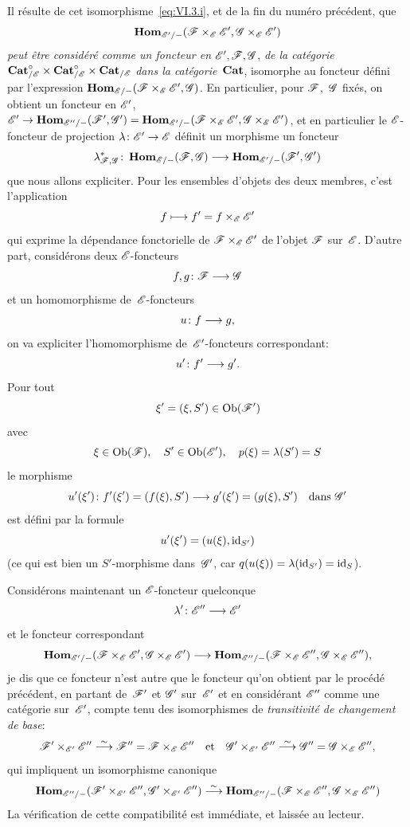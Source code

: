 Il r\'esulte de cet isomorphisme~\eqref{eq:VI.3.i}, et de la fin du
num\'ero pr\'ec\'edent, que
$$
\SheafHom_{\cal{E}'/-}(\cal{F}\times_{\cal{E}}\cal{E}',\cal{G}
\times_{\cal{E}}\cal{E}')
$$
\emph{peut être considéré comme un foncteur en}
$\cal{E}',\cal{F},\cal{G}$, \emph{de la catégorie}
$\Cat_{/\cal{E}}^\circ\times\Cat_{/\cal{E}}^\circ\times\Cat_{/\cal{E}}$
\emph{dans la catégorie}~$\mathbf{Cat}$, isomorphe au foncteur d\'efini
par l'expression
$\SheafHom_{\cal{E}/-}(\cal{F}\times_{\cal{E}}\cal{E}',\cal{G})$. En
particulier, pour $\cal{F}$,~$\cal{G}$ fix\'es, on obtient un
foncteur en $\cal{E}'$, $\cal{E}'\to
\SheafHom_{\cal{E}''/-}(\cal{F}',\cal{G}')=
\SheafHom_{\cal{E}'/-}(\cal{F}\times_{\cal{E}}
\cal{E}',\cal{G}\times_{\cal{E}}\cal{E}')$, et en particulier le
$\cal{E}$-foncteur de projection $\lambda\colon \cal{E}'\to\cal{E}$
d\'efinit un morphisme \ie un foncteur
$$
\lambda^*_{\cal{F},\cal{G}}\colon
\SheafHom_{\cal{E}/-}(\cal{F},\cal{G})\to
\SheafHom_{\cal{E}'/-}(\cal{F}',\cal{G}')
$$
que nous allons expliciter. Pour les ensembles d'objets des deux
membres, c'est l'application
$$
f\mto f'=f\times_{\cal{E}}\cal{E}'
$$
qui exprime la d\'ependance fonctorielle de
$\cal{F}\times_{\cal{E}}\cal{E}'$ de l'objet $\cal{F}$
sur~$\cal{E}$. D'autre part, consid\'erons deux $\cal{E}$-foncteurs
$$
f,g\colon\cal{F}\to \cal{G}
$$
et un homomorphisme de~$\cal{E}$-foncteurs
$$
u\colon f\to g\quoi,
$$
on
va expliciter l'homomorphisme de~$\cal{E}'$-foncteurs correspondant:
$$
u'\colon f'\to g'\quoi.
$$
Pour tout
$$
\xi'=(\xi,S')\in\Ob(\cal{F}')
$$
avec
$$
\xi\in\Ob(\cal{F}),\quad S'\in\Ob(\cal{E}'),\quad p(\xi)=\lambda(S')=S
$$
le morphisme
$$
u'(\xi')\colon f'(\xi')=(f(\xi),S')\to g'(\xi')=(g(\xi),S')\quad
\text{dans } \cal{G}'
$$
est d\'efini par la formule
$$
u'(\xi')=(u(\xi),\mathrm{id}_{S'})
$$
(ce qui est bien un $S'$-morphisme dans~$\cal{G}'$, car
$q(u(\xi))=\lambda(\mathrm{id}_{S'})=\mathrm{id}_S$).

Consid\'erons maintenant un $\cal{E}$-foncteur quelconque
$$
\lambda'\colon\cal{E}''\to\cal{E}'
$$
et le foncteur correspondant
$$
\SheafHom_{\cal{E}'/-}(\cal{F}\times_{\cal{E}}\cal{E}',
\cal{G}\times_{\cal{E}}\cal{E}')\to
\SheafHom_{\cal{E}''/-}(\cal{F}\times_{\cal{E}}\cal{E}'',
\cal{G}\times_{\cal{E}}\cal{E}'')\quoi,
$$
je dis que ce foncteur n'est autre que le foncteur qu'on obtient par
le proc\'ed\'e pr\'ec\'edent, en partant de~$\cal{F}'$ et
$\cal{G}'$ sur~$\cal{E}'$ et en consid\'erant $\cal{E}''$ comme une
cat\'egorie sur~$\cal{E}'$, compte tenu des isomorphismes de
\emph{\og transitivité de changement de base\fg}:
$$
\cal{F}'\times_{\cal{E}'}\cal{E}''\isomto
\cal{F}''=\cal{F}\times_{\cal{E}}\cal{E}''\quad
\text{et}\quad\cal{G}'\times_{\cal{E}'}\cal{E}''\isomto\cal{G}''
=\cal G\times_{\cal E}\cal E''\quoi,
$$
qui impliquent un isomorphisme canonique
$$
\SheafHom_{\cal{E}''/-}(\cal{F}'\times_{\cal{E}'}\cal{E}'',
\cal{G}'\times_{\cal{E}'}\cal{E}'')\isomto
\SheafHom_{\cal{E}''/-}(\cal{F}\times_{\cal{E}}\cal{E}'',
\cal{G}\times_{\cal{E}}\cal{E}'')
$$
La
v\'erification de cette compatibilit\'e est imm\'ediate, et
laiss\'ee au lecteur.

